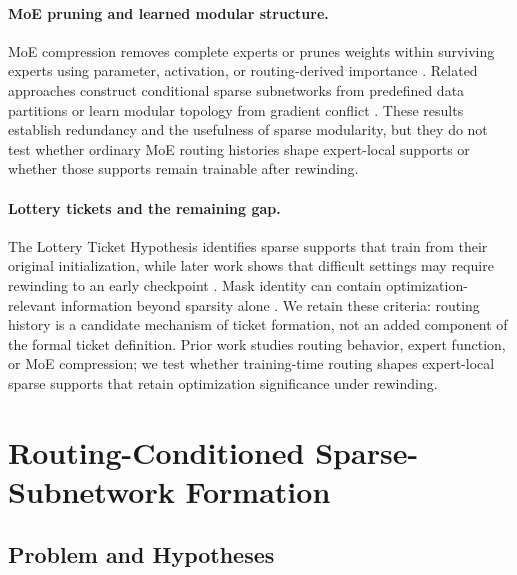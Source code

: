 \documentclass{article}
\begin{document}
\paragraph{MoE pruning and learned modular structure.}
MoE compression removes complete experts or prunes weights within surviving
experts using parameter, activation, or routing-derived importance
\citep{chen2022taskspecific,lu2024notall,
xie2024moeprunerpruningmixtureofexpertslarge,
lee2025stunstructuredthenunstructuredpruningscalable}. Related approaches
construct conditional sparse subnetworks from predefined data partitions or
learn modular topology from gradient conflict
\citep{stefanski2026routing,gan2025cdsp}. These results establish redundancy
and the usefulness of sparse modularity, but they do not test whether ordinary
MoE routing histories shape expert-local supports or whether those supports
remain trainable after rewinding.

\paragraph{Lottery tickets and the remaining gap.}
The Lottery Ticket Hypothesis identifies sparse supports that train from their
original initialization, while later work shows that difficult settings may
require rewinding to an early checkpoint
\citep{frankle2019lotterytickethypothesisfinding,pmlr-v119-frankle20a}.
Mask identity can contain optimization-relevant information beyond sparsity
alone \citep{paul2023unmasking}. We retain these criteria: routing history is a
candidate mechanism of ticket formation, not an added component of the formal
ticket definition. Prior work studies routing behavior, expert function, or
MoE compression; we test whether training-time routing shapes expert-local
sparse supports that retain optimization significance under rewinding.

\section{Routing-Conditioned Sparse-Subnetwork Formation}
\label{sec:formation}

\subsection{Problem and Hypotheses}
\label{sec:problem}
\end{document}
